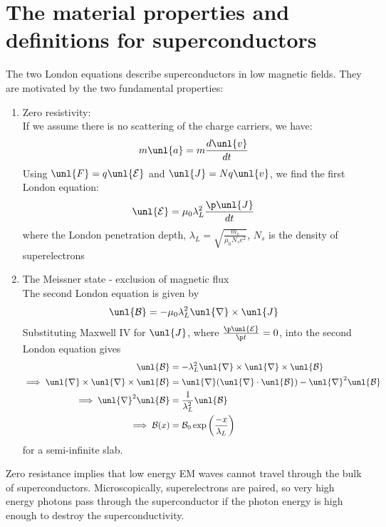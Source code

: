 \documentclass[a4paper, 11pt, normalem]{report}
\renewcommand\E{\mathcal{E}}
\newcommand\uE{\unl{\E}}
\renewcommand\B{\mathcal{B}}
\newcommand\uB{\unl{\B}}
\renewcommand\del{\unl{\nabla}}
\newcommand\J{\unl{J}}
\newcommand\pen{\lambda_L}
\begin{document}
\section{The material properties and definitions for superconductors}
The two London equations describe superconductors in low magnetic fields.
They are motivated by the two fundamental properties:
\begin{enumerate}
	\item Zero resistivity: \\
	If we assume there is no scattering of the charge carriers, we have:
	\begin{equation}
		m\unl{a} = m\frac{d\unl{v}}{dt}
	\end{equation}
	Using $\unl{F} = q\uE$ and $\J = Nq\unl{v}$, we find the first London equation:
	\begin{equation}
		\uE = \mu_0\lambda_L^2\frac{\p \J}{dt}
	\end{equation}
	where the London penetration depth, $\pen = \sqrt{\frac{m_e}{\mu_0N_se^2}}$, $N_s$ is the density of superelectrons
	\item The Meissner state - exclusion of magnetic flux \\
	The second London equation is given by
	\begin{equation}
		\uB = -\mu_0\pen^2\del\times\J
	\end{equation}
	Substituting Maxwell \RN{4} for $\J$, where $\frac{\p\uE}{\p t} = 0$, into the second London equation gives
	\begin{align}
		\uB &= -\pen^2\del\times\del\times\uB \\
		\implies \del\times\del\times\uB &= \del(\del\cdot\uB) - \del^2\uB \\
		\implies \del^2\uB &= \frac{1}{\pen^2}\uB \\
		\implies \B(x) &= \B_0\exp\left(\frac{-x}{\pen}\right)
	\end{align}
	for a semi-infinite slab.
\end{enumerate}
Zero resistance implies that low energy EM waves cannot travel through the bulk of superconductors.
Microscopically, superelectrons are paired, so very high energy photons pass through the superconductor if the photon energy is high enough to destroy the superconductivity.
\end{document}
